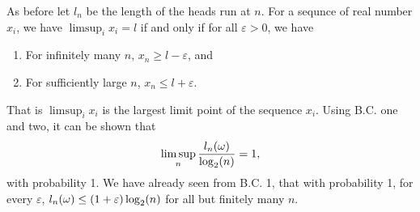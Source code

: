 \begin{ex}
    As before let $l_n$ be the length of the heads run at $n$. For a sequnce of real number $x_i$, we have $\limsup_{i} x_i =l$ if and only if for all $\varepsilon > 0$, we have
    \begin{enumerate}
        \item For infinitely many $n$, $x_n \ge l -\varepsilon$, and
        \item For sufficiently large $n$, $x_n \le l +\varepsilon$.
    \end{enumerate}
    That is $\limsup_i x_i$ is the largest limit point of the sequence $x_i$. Using B.C. one and two, it can be shown that 
    \[\limsup_n \frac{l_n({\omega})}{\log_2(n)} =1, \]
    with probability 1. We have already seen from B.C. 1, that with probability 1, for every $\varepsilon$, $l_n({\omega}) \le (1+\varepsilon)\log_2(n)$ for all but finitely many $n$.
\end{ex}
